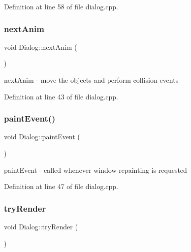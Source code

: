 Definition at line 58 of file dialog.\+cpp.

\mbox{\label{class_dialog_a45158754d3f4531b29a0f50abde94597}} 
\subsubsection{\texorpdfstring{next\+Anim}{nextAnim}}
{\footnotesize\ttfamily void Dialog\+::next\+Anim (\begin{DoxyParamCaption}{ }\end{DoxyParamCaption})\hspace{0.3cm}{\ttfamily [slot]}}



next\+Anim -\/ move the objects and perform collision events 



Definition at line 43 of file dialog.\+cpp.

\mbox{\label{class_dialog_a93e4c843803f26bfe5746529cf163ec5}} 
\subsubsection{\texorpdfstring{paint\+Event()}{paintEvent()}}
{\footnotesize\ttfamily void Dialog\+::paint\+Event (\begin{DoxyParamCaption}\item[{Q\+Paint\+Event $\ast$}]{ }\end{DoxyParamCaption})\hspace{0.3cm}{\ttfamily [protected]}}



paint\+Event -\/ called whenever window repainting is requested 



Definition at line 47 of file dialog.\+cpp.

\mbox{\label{class_dialog_aa887f720e12758049bb9f1f1814759da}} 
\subsubsection{\texorpdfstring{try\+Render}{tryRender}}
{\footnotesize\ttfamily void Dialog\+::try\+Render (\begin{DoxyParamCaption}{ }\end{DoxyParamCaption})\hspace{0.3cm}{\ttfamily [slot]}}



